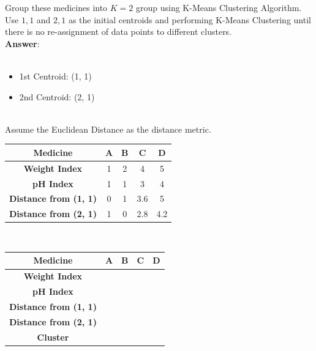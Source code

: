 \documentclass{book}
\begin{document}
Group these medicines into \(K=2\) group using K-Means Clustering Algorithm.\\
Use \(1,1\) and \(2,1\) as the initial centroids and performing K-Means Clustering until there is no re-assignment of data points to different clusters.\\
\vspace{2mm}
\textbf{Answer}:\\
\\
\begin{itemize}
    \item 1st Centroid: (1, 1)
    \item 2nd Centroid: (2, 1)
\end{itemize}
\\
Assume the Euclidean Distance as the distance metric.\\
\begin{center}
    \begin{tabular}{|c|c|c|c|c|}
        \hline
        \rowcolor{lightblue}
        \textbf{Medicine} & \textbf{A} & \textbf{B} & \textbf{C} & \textbf{D}\\
        \hline
        \textbf{Weight Index} & 1 & 2 & 4 & 5 \\
        \hline
        \textbf{pH Index} & 1 & 1 & 3 & 4 \\
        \hline
        \textbf{Distance from (1, 1)} & 0 & 1 & 3.6 & 5 \\
        \hline
        \textbf{Distance from (2, 1)} & 1 & 0 & 2.8 & 4.2 \\
        \hline
    \end{tabular}
\end{center}
\\
\begin{center}
    \begin{tabular}{|c|c|c|c|c|}
        \hline
        \rowcolor{lightblue}
        \textbf{Medicine} & \textbf{A} & \textbf{B} & \textbf{C} & \textbf{D}\\
        \hline
        \textbf{Weight Index} & \cellcolor{lightyellow}{1} & \cellcolor{lightred}{2} & \cellcolor{lightred}{4} & \cellcolor{lightred}{5} \\
        \hline
        \textbf{pH Index} & \cellcolor{lightyellow}{1} & \cellcolor{lightred}{1} & \cellcolor{lightred}{3} & \cellcolor{lightred}{4} \\
        \hline
        \textbf{Distance from (1, 1)} & \cellcolor{lightyellow}{0} & \cellcolor{lightred}{1} & \cellcolor{lightred}{3.6} & \cellcolor{lightred}{5} \\
        \hline
        \textbf{Distance from (2, 1)} & \cellcolor{lightyellow}{1} & \cellcolor{lightred}{0} & \cellcolor{lightred}{2.8} & \cellcolor{lightred}{4.2} \\
        \hline
        \textbf{Cluster} & \cellcolor{lightyellow}{1} & \cellcolor{lightred}{2} & \cellcolor{lightred}{2} & \cellcolor{lightred}{2} \\
        \hline
    \end{tabular}
\end{center}
\end{document}
